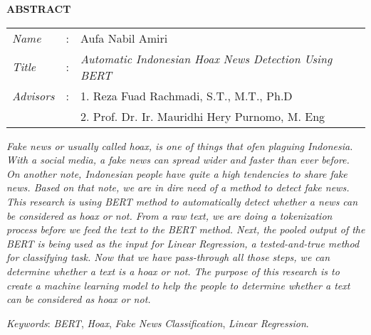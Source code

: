 \begin{center}
  \large\textbf{ABSTRACT}
\end{center}


\vspace{2ex}

\begingroup
\setlength{\tabcolsep}{0pt}

\noindent
\begin{tabularx}{\textwidth}{l >{\centering}m{3em} X}
  \emph{Name}     & : & Aufa Nabil Amiri                                             \\

  \emph{Title}    & : & \emph{ Automatic Indonesian Hoax News Detection Using BERT } \\

  \emph{Advisors} & : & 1. Reza Fuad Rachmadi, S.T., M.T., Ph.D                      \\
                  &   & 2. Prof. Dr. Ir. Mauridhi Hery Purnomo, M. Eng               \\
\end{tabularx}
\endgroup

\textit{
  Fake news or usually called hoax, is one of things that ofen plaguing Indonesia. With a social media, a fake news can spread wider and faster than ever before. On another note, Indonesian people have quite a high tendencies to share fake news. Based on that note, we are in dire need of a method to detect fake news. This research is using BERT method to automatically detect whether a news can be considered as hoax or not. From a raw text, we are doing a tokenization process before we feed the text to the BERT method. Next, the pooled output of the BERT is being used as the input for Linear Regression, a tested-and-true method for classifying task. Now that we have pass-through all  those steps, we can determine whether a text is a hoax or not. The purpose of this research is to create a machine learning model to help the people to determine whether a text can be considered as hoax or not.
}

\emph{Keywords}: \emph{BERT}, \emph{Hoax}, \emph{Fake News} \emph{Classification}, \emph{Linear Regression}.
